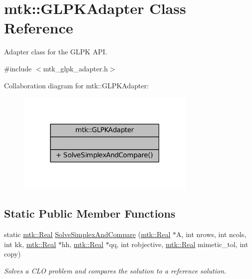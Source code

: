 \hypertarget{classmtk_1_1GLPKAdapter}{\section{mtk\+:\+:G\+L\+P\+K\+Adapter Class Reference}
\label{classmtk_1_1GLPKAdapter}
}


Adapter class for the G\+L\+P\+K A\+P\+I.  




{\ttfamily \#include $<$mtk\+\_\+glpk\+\_\+adapter.\+h$>$}



Collaboration diagram for mtk\+:\+:G\+L\+P\+K\+Adapter\+:\nopagebreak
\begin{figure}[H]
\begin{center}
\leavevmode
\includegraphics[width=243pt]{classmtk_1_1GLPKAdapter__coll__graph}
\end{center}
\end{figure}
\subsection*{Static Public Member Functions}
\begin{DoxyCompactItemize}
\item 
static \hyperlink{group__c01-roots_gac080bbbf5cbb5502c9f00405f894857d}{mtk\+::\+Real} \hyperlink{classmtk_1_1GLPKAdapter_a834480aca83e3c0d09fdab7fdb7e8a3f}{Solve\+Simplex\+And\+Compare} (\hyperlink{group__c01-roots_gac080bbbf5cbb5502c9f00405f894857d}{mtk\+::\+Real} $\ast$A, int nrows, int ncols, int kk, \hyperlink{group__c01-roots_gac080bbbf5cbb5502c9f00405f894857d}{mtk\+::\+Real} $\ast$hh, \hyperlink{group__c01-roots_gac080bbbf5cbb5502c9f00405f894857d}{mtk\+::\+Real} $\ast$qq, int robjective, \hyperlink{group__c01-roots_gac080bbbf5cbb5502c9f00405f894857d}{mtk\+::\+Real} mimetic\+\_\+tol, int copy)
\begin{DoxyCompactList}\small\item\em Solves a C\+L\+O problem and compares the solution to a reference solution. \end{DoxyCompactList}\end{DoxyCompactItemize}


